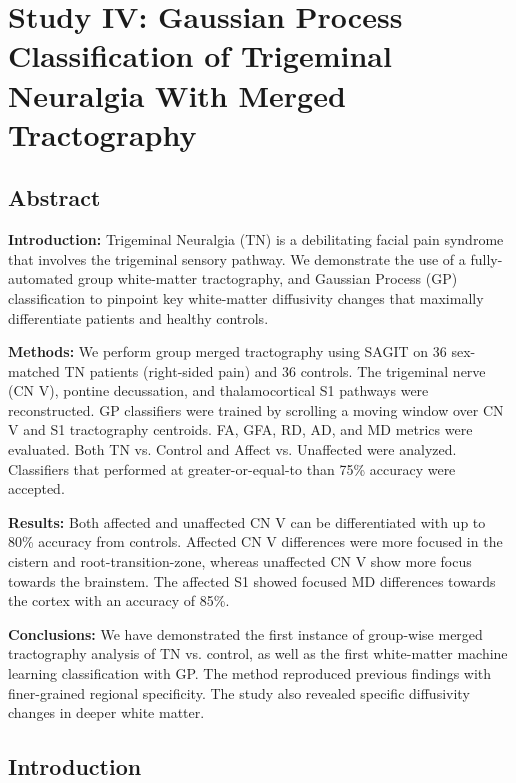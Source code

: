 \graphicspath{{images/tn-gp-sagit/drafts/}}

\chapter{Study IV: Gaussian Process Classification of Trigeminal Neuralgia With Merged Tractography}

\section{Abstract}
\textbf{Introduction:} Trigeminal Neuralgia (TN) is a debilitating facial pain syndrome that involves the trigeminal sensory pathway. We demonstrate the use of a fully-automated group white-matter tractography, and Gaussian Process (GP) classification to pinpoint key white-matter diffusivity changes that maximally differentiate patients and healthy controls. 

\textbf{Methods:} We perform group merged tractography using SAGIT on 36 sex-matched TN patients (right-sided pain) and 36 controls. The trigeminal nerve (CN V), pontine decussation, and thalamocortical S1 pathways were reconstructed. GP classifiers were trained by scrolling a moving window over CN V and S1 tractography centroids. FA, GFA, RD, AD, and MD metrics were evaluated. Both TN vs. Control and Affect vs. Unaffected were analyzed. Classifiers that performed at greater-or-equal-to than 75\% accuracy were accepted.

\textbf{Results:} Both affected and unaffected CN V can be differentiated with up to 80\% accuracy from controls. Affected CN V differences were more focused in the cistern and root-transition-zone, whereas unaffected CN V show more focus towards the brainstem. The affected S1 showed focused MD differences towards the cortex with an accuracy of 85\%. 

\textbf{Conclusions:} We have demonstrated the first instance of group-wise merged tractography analysis of TN vs. control,  as well as the first white-matter machine learning classification with GP. The method reproduced previous findings with finer-grained regional specificity. The study also revealed specific diffusivity changes in deeper white matter.

\section{Introduction}
